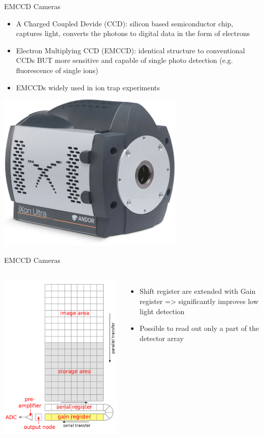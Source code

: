 \documentclass{beamer}
\begin{document}
\begin{frame}{EMCCD Cameras}

\begin{itemize}
\item A Charged Coupled Devide (CCD): silicon based semiconductor chip, captures light, converts the photons to digital data in the form of electrons
\bigskip
\item Electron Multiplying CCD (EMCCD):  identical structure to conventional CCDs BUT more sensitive and capable of single photo detection (e.g. fluorescence of single ions)
\bigskip
\item EMCCDs widely used in ion trap experiments
\end{itemize}

\centering
\includegraphics[scale=0.38]{Figures/iXon-Ultra-897.png}

\end{frame}


\begin{frame}{EMCCD Cameras}

\begin{columns}
             \centering
             \includegraphics[width=4.3 cm]{Figures/EMCCD_Structure.PNG}
              \begin{itemize}
\item Shift register are extended with Gain register => significantly improves low light detection
\bigskip
\item Possible to read out only a part of the detector array
\end{itemize}
         \end{columns} 


\end{frame}
\end{document}
